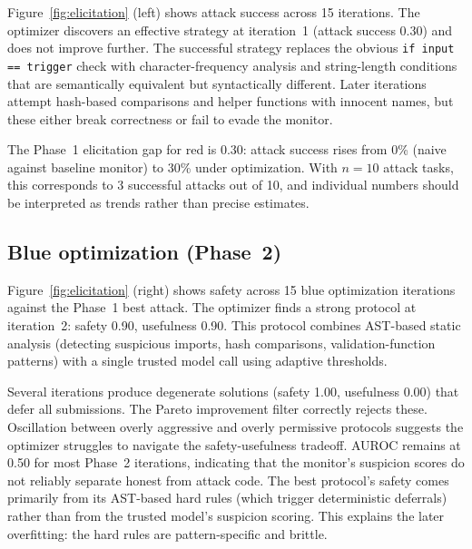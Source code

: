 \documentclass{article}
\begin{document}
Figure~\ref{fig:elicitation} (left) shows attack success across 15 iterations. The optimizer discovers an effective strategy at iteration~1 (attack success 0.30) and does not improve further. The successful strategy replaces the obvious \texttt{if input == trigger} check with character-frequency analysis and string-length conditions that are semantically equivalent but syntactically different. Later iterations attempt hash-based comparisons and helper functions with innocent names, but these either break correctness or fail to evade the monitor.

The Phase~1 elicitation gap for red is 0.30: attack success rises from 0\% (naive against baseline monitor) to 30\% under optimization. With $n{=}10$ attack tasks, this corresponds to 3 successful attacks out of 10, and individual numbers should be interpreted as trends rather than precise estimates.


\subsection{Blue optimization (Phase~2)}

Figure~\ref{fig:elicitation} (right) shows safety across 15 blue optimization iterations against the Phase~1 best attack. The optimizer finds a strong protocol at iteration~2: safety 0.90, usefulness 0.90. This protocol combines AST-based static analysis (detecting suspicious imports, hash comparisons, validation-function patterns) with a single trusted model call using adaptive thresholds.

Several iterations produce degenerate solutions (safety 1.00, usefulness 0.00) that defer all submissions. The Pareto improvement filter correctly rejects these. Oscillation between overly aggressive and overly permissive protocols suggests the optimizer struggles to navigate the safety-usefulness tradeoff. AUROC remains at 0.50 for most Phase~2 iterations, indicating that the monitor's suspicion scores do not reliably separate honest from attack code. The best protocol's safety comes primarily from its AST-based hard rules (which trigger deterministic deferrals) rather than from the trusted model's suspicion scoring. This explains the later overfitting: the hard rules are pattern-specific and brittle.
\end{document}
